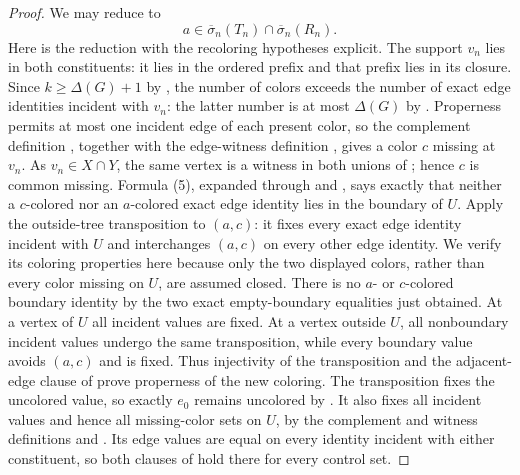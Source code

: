 \begin{proof}
We may reduce to
\[
        a\in\overline\sigma_n(T_n)
             \cap\overline\sigma_n(R_n).                     \tag{9}
\]
Here is the reduction with the recoloring hypotheses explicit.  The
support $v_n$ lies in both constituents: it lies in the ordered prefix
and that prefix lies in its closure.  Since $k\geq\Delta(G)+1$ by
, the number of colors exceeds the number of exact edge
identities incident with $v_n$: the latter number is at most
$\Delta(G)$ by .  Properness permits at most one
incident edge of each present color, so the complement definition
, together with the edge-witness definition
, gives a color $c$ missing at $v_n$.
As $v_n\in X\cap Y$, the same vertex is a witness in both unions of
; hence $c$ is common missing.  Formula (5),
expanded through  and
, says exactly that neither a $c$-colored nor
an $a$-colored exact edge identity lies in the boundary of $U$.
Apply the outside-tree transposition
 to $(a,c)$: it fixes every exact edge
identity incident with $U$ and interchanges $(a,c)$ on every other edge
identity.  We verify its coloring properties here because only the two
displayed colors, rather than every color missing on $U$, are assumed
closed.  There is no $a$- or $c$-colored boundary identity by the two
exact empty-boundary equalities just obtained.  At a vertex of $U$ all incident
values are fixed.  At a vertex outside $U$, all nonboundary incident
values undergo the same transposition, while every boundary value avoids
$(a,c)$ and is fixed.  Thus injectivity of the transposition and the
adjacent-edge clause of  prove properness
of the new coloring.  The transposition fixes the uncolored value, so
exactly $e_0$ remains uncolored by .  It also
fixes all incident values and hence all missing-color
sets on $U$, by the complement and witness definitions
 and .  Its edge values are
equal on every identity incident with either constituent, so both clauses
of  hold there for every control set.


\end{proof}
